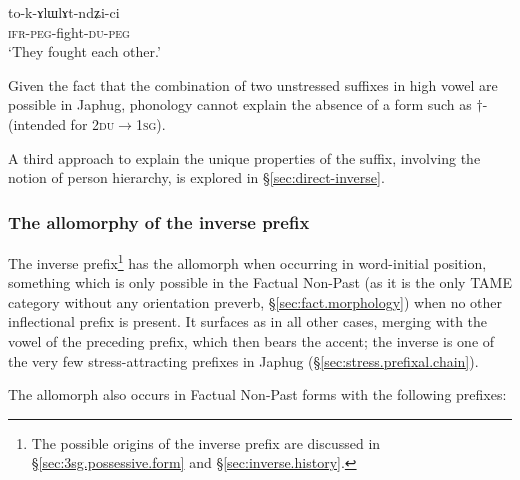 \begin{exe}
\ex \label{ex:tokAlWlAtndZici}
\gll to-k-ɤlɯlɤt-ndʑi-ci \\
\textsc{ifr}-\textsc{peg}-fight-\textsc{du}-\textsc{peg} \\
\glt `They fought each other.'
\end{exe}

Given the fact that the combination of two unstressed suffixes in high vowel are possible in Japhug, phonology cannot explain the absence of a form such as $\dagger$\siga{}- (intended for \textsc{2du$\rightarrow$1sg}).

A third approach to explain the unique properties of the  suffix, involving the notion of person hierarchy, is explored in §\ref{sec:direct-inverse}.

\subsubsection{The allomorphy of the inverse prefix} \label{sec:allomorphy.inv}
  
The inverse prefix\footnote{The possible origins of the inverse prefix are discussed in §\ref{sec:3sg.possessive.form} and §\ref{sec:inverse.history}.} has the allomorph  when occurring in word-initial position, something which is only possible in the Factual Non-Past (as it is the only TAME category without any orientation preverb, §\ref{sec:fact.morphology}) when no other inflectional prefix is present. It surfaces as  in all other cases, merging with the vowel of the preceding prefix, which then bears the accent; the inverse is one of the very few stress-attracting prefixes in Japhug (§\ref{sec:stress.prefixal.chain}).

The allomorph  also occurs in Factual Non-Past forms with the following prefixes:

